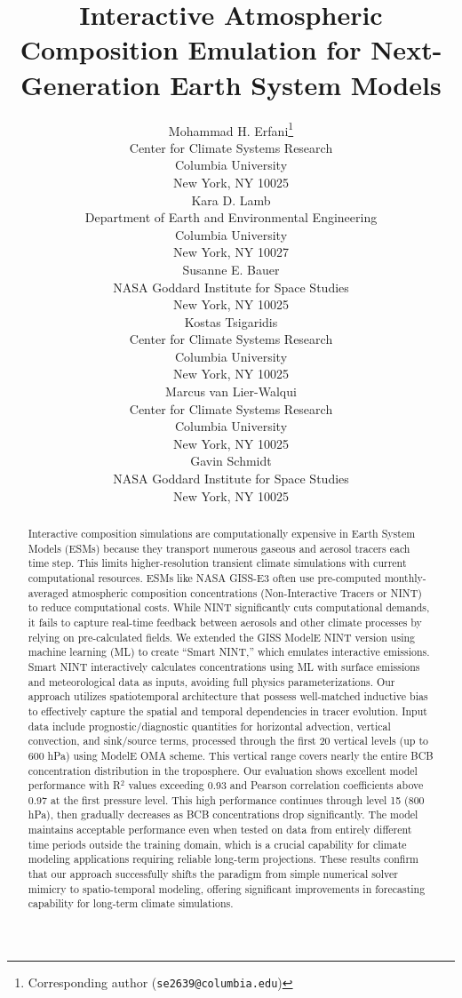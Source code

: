 \documentclass{article}
\title{Interactive Atmospheric Composition Emulation for Next-Generation Earth System Models}
\author{%
    Mohammad H. Erfani\thanks{Corresponding author (\texttt{se2639@columbia.edu})} \\
    Center for Climate Systems Research\\
    Columbia University\\
    New York, NY 10025 \\
    \And
    Kara D. Lamb \\
    Department of Earth and Environmental Engineering \\
    Columbia University \\
    New York, NY 10027\\
    \And
    Susanne E. Bauer \\
    NASA Goddard Institute for Space Studies\\
    New York, NY 10025 \\
    \And
    Kostas Tsigaridis \\
    Center for Climate Systems Research\\
    Columbia University\\
    New York, NY 10025 \\
    \And
    Marcus van Lier-Walqui\\
    Center for Climate Systems Research\\
    Columbia University\\
    New York, NY 10025\\
    \And
    Gavin Schmidt\\
    NASA Goddard Institute for Space Studies\\
    New York, NY 10025 \\
}
\begin{document}
\maketitle

\begin{abstract}
    Interactive composition simulations are computationally expensive in Earth System Models (ESMs) because they transport numerous gaseous and aerosol tracers each time step. This limits higher-resolution transient climate simulations with current computational resources. ESMs like NASA GISS-E3 often use pre-computed monthly-averaged atmospheric composition concentrations (Non-Interactive Tracers or NINT) to reduce computational costs. While NINT significantly cuts computational demands, it fails to capture real-time feedback between aerosols and other climate processes by relying on pre-calculated fields. We extended the GISS ModelE NINT version using machine learning (ML) to create ``Smart NINT,'' which emulates interactive emissions. Smart NINT interactively calculates concentrations using ML with surface emissions and meteorological data as inputs, avoiding full physics parameterizations. Our approach utilizes spatiotemporal architecture that possess well-matched inductive bias to effectively capture the spatial and temporal dependencies in tracer evolution. Input data include prognostic/diagnostic quantities for horizontal advection, vertical convection, and sink/source terms, processed through the first 20 vertical levels (up to 600 hPa) using ModelE OMA scheme. This vertical range covers nearly the entire BCB concentration distribution in the troposphere. Our evaluation shows excellent model performance with R$^2$ values exceeding 0.93 and Pearson correlation coefficients above 0.97 at the first pressure level. This high performance continues through level 15 (800 hPa), then gradually decreases as BCB concentrations drop significantly. The model maintains acceptable performance even when tested on data from entirely different time periods outside the training domain, which is a crucial capability for climate modeling applications requiring reliable long-term projections. These results confirm that our approach successfully shifts the paradigm from simple numerical solver mimicry to spatio-temporal modeling, offering significant improvements in forecasting capability for long-term climate simulations.
\end{abstract}
\end{document}
